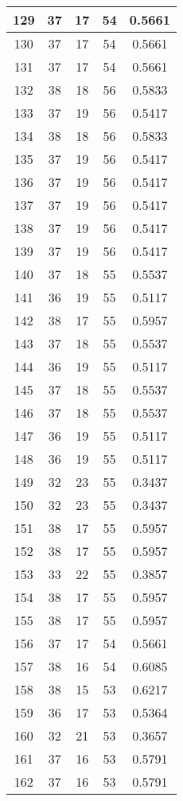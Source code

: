 \documentclass[letterpaper, 12pt]{article}
\begin{document}
\begin{longtable}{|c|c|c|c|c|}
\hline
129 & 37 & 17 & 54 & 0.5661 \\
\hline
130 & 37 & 17 & 54 & 0.5661 \\
\hline
131 & 37 & 17 & 54 & 0.5661 \\
\hline
132 & 38 & 18 & 56 & 0.5833 \\
\hline
133 & 37 & 19 & 56 & 0.5417 \\
\hline
134 & 38 & 18 & 56 & 0.5833 \\
\hline
135 & 37 & 19 & 56 & 0.5417 \\
\hline
136 & 37 & 19 & 56 & 0.5417 \\
\hline
137 & 37 & 19 & 56 & 0.5417 \\
\hline
138 & 37 & 19 & 56 & 0.5417 \\
\hline
139 & 37 & 19 & 56 & 0.5417 \\
\hline
140 & 37 & 18 & 55 & 0.5537 \\
\hline
141 & 36 & 19 & 55 & 0.5117 \\
\hline
142 & 38 & 17 & 55 & 0.5957 \\
\hline
143 & 37 & 18 & 55 & 0.5537 \\
\hline
144 & 36 & 19 & 55 & 0.5117 \\
\hline
145 & 37 & 18 & 55 & 0.5537 \\
\hline
146 & 37 & 18 & 55 & 0.5537 \\
\hline
147 & 36 & 19 & 55 & 0.5117 \\
\hline
148 & 36 & 19 & 55 & 0.5117 \\
\hline
149 & 32 & 23 & 55 & 0.3437 \\
\hline
150 & 32 & 23 & 55 & 0.3437 \\
\hline
151 & 38 & 17 & 55 & 0.5957 \\
\hline
152 & 38 & 17 & 55 & 0.5957 \\
\hline
153 & 33 & 22 & 55 & 0.3857 \\
\hline
154 & 38 & 17 & 55 & 0.5957 \\
\hline
155 & 38 & 17 & 55 & 0.5957 \\
\hline
156 & 37 & 17 & 54 & 0.5661 \\
\hline
157 & 38 & 16 & 54 & 0.6085 \\
\hline
158 & 38 & 15 & 53 & 0.6217 \\
\hline
159 & 36 & 17 & 53 & 0.5364 \\
\hline
160 & 32 & 21 & 53 & 0.3657 \\
\hline
161 & 37 & 16 & 53 & 0.5791 \\
\hline
162 & 37 & 16 & 53 & 0.5791 \\

\end{longtable}
\end{document}
